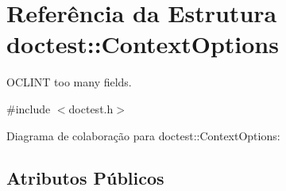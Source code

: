 \hypertarget{structdoctest_1_1ContextOptions}{}\section{Referência da Estrutura doctest\+:\+:Context\+Options}
\label{structdoctest_1_1ContextOptions}


O\+C\+L\+I\+NT too many fields.  




{\ttfamily \#include $<$doctest.\+h$>$}



Diagrama de colaboração para doctest\+:\+:Context\+Options\+:
\subsection*{Atributos Públicos}
